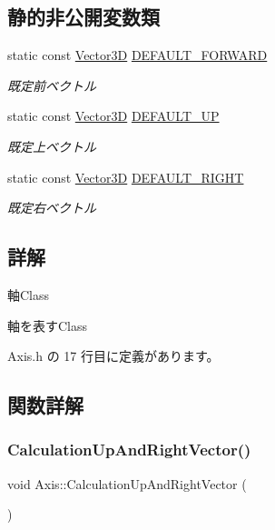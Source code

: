 \subsection*{静的非公開変数類}
\begin{DoxyCompactItemize}
\item 
static const \mbox{\hyperlink{class_vector3_d}{Vector3D}} \mbox{\hyperlink{class_axis_a3360259f8662e72e5d86405647dc0188}{D\+E\+F\+A\+U\+L\+T\+\_\+\+F\+O\+R\+W\+A\+RD}}
\begin{DoxyCompactList}\small\item\em 既定前ベクトル \end{DoxyCompactList}\item 
static const \mbox{\hyperlink{class_vector3_d}{Vector3D}} \mbox{\hyperlink{class_axis_afe3787d2e4c4affc0c4ab43a5f52891e}{D\+E\+F\+A\+U\+L\+T\+\_\+\+UP}}
\begin{DoxyCompactList}\small\item\em 既定上ベクトル \end{DoxyCompactList}\item 
static const \mbox{\hyperlink{class_vector3_d}{Vector3D}} \mbox{\hyperlink{class_axis_a12c07eb8804a096a9c72d8f6d4abf6f7}{D\+E\+F\+A\+U\+L\+T\+\_\+\+R\+I\+G\+HT}}
\begin{DoxyCompactList}\small\item\em 既定右ベクトル \end{DoxyCompactList}\end{DoxyCompactItemize}


\subsection{詳解}
軸\+Class 

軸を表す\+Class 

 Axis.\+h の 17 行目に定義があります。



\subsection{関数詳解}
\mbox{\label{class_axis_af27bd2cc59e50b8a7256434cd4214c2b}} 
\subsubsection{\texorpdfstring{Calculation\+Up\+And\+Right\+Vector()}{CalculationUpAndRightVector()}}
{\footnotesize\ttfamily void Axis\+::\+Calculation\+Up\+And\+Right\+Vector (\begin{DoxyParamCaption}{ }\end{DoxyParamCaption})\hspace{0.3cm}{\ttfamily [private]}}



